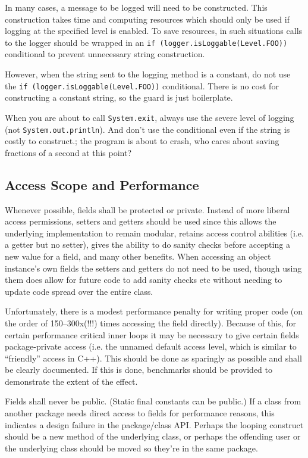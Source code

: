 In many cases, a message to be logged will need to be constructed. This construction takes time and computing resources which should only be used if logging at the specified level is enabled. To save resources, in such situations calls to the logger should be wrapped in an {\tt if (logger.isLoggable(Level.FOO))} conditional to prevent unnecessary string construction.

However, when the string sent to the logging method is a constant, do not use the {\tt if (logger.isLoggable(Level.FOO))} conditional. There is no cost for constructing a constant string, so the guard is just boilerplate.

When you are about to call {\tt System.exit}, always use the severe level of logging (not {\tt System.out.println}). And don't use the conditional even if the string is costly to construct.; the program is about to crash, who cares about saving fractions of a second at this point? 


\subsection{Access Scope and Performance}

Whenever possible, fields shall be protected or private. Instead of more liberal access permissions, setters and getters should be used since this allows the underlying implementation to remain modular, retains access control abilities (i.e. a getter but no setter), gives the ability to do sanity checks before accepting a new value for a field, and many other benefits. When accessing an object instance's own fields the setters and getters do not need to be used, though using them does allow for future code to add sanity checks etc without needing to update code spread over the entire class.

Unfortunately, there is a modest performance penalty for writing proper code (on the order of 150--300x(!!!) times accessing the field directly). Because of this, for certain performance critical inner loops it may be necessary to give certain fields package-private access (i.e. the unnamed default access level, which is similar to ``friendly'' access in C++). This should be done as sparingly as possible and shall be clearly documented. If this is done, benchmarks should be provided to demonstrate the extent of the effect.

Fields shall never be public. (Static final constants can be public.) If a class from another package needs direct access to fields for performance reasons, this indicates a design failure in the package/class API. Perhaps the looping construct should be a new method of the underlying class, or perhaps the offending user or the underlying class should be moved so they're in the same package. 